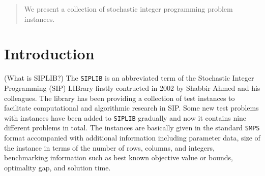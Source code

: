 

\date{Received: date / Accepted: date}


\maketitle

\begin{abstract}
We present a collection of stochastic integer programming problem instances.
\end{abstract}

\section{Introduction}
(What is SIPLIB?) The \texttt{SIPLIB} \cite{web:SIPLIB1} is an abbreviated term of the Stochastic Integer Programming (SIP) LIBrary firstly contructed in 2002 by Shabbir Ahmed and his colleagues. The library has been providing a collection of test instances to facilitate computational and algorithmic research in SIP. Some new test problems with instances have been added to \texttt{SIPLIB} gradually and now it contains nine different problems in total.  The instances are basically given in the standard \texttt{SMPS} format accompanied with additional information including parameter data, size of the instance in terms of the number of rows, columns, and integers, benchmarking information such as best known objective value or bounds, optimality gap, and solution time.

